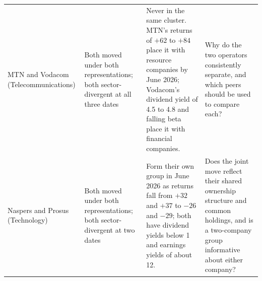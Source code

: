 \begin{table}[htbp]
\begin{tabularx}{\linewidth}{@{}>{\raggedright\arraybackslash}p{2.0cm}>{\raggedright\arraybackslash}p{2.3cm}>{\raggedright\arraybackslash}X>{\raggedright\arraybackslash}X@{}}
\addlinespace
MTN and Vodacom (Telecommunications) & Both moved under both representations; both sector-divergent at all three dates & Never in the same cluster. MTN's returns of $+62$ to $+84$ place it with resource companies by June 2026; Vodacom's dividend yield of 4.5 to 4.8 and falling beta place it with financial companies. & Why do the two operators consistently separate, and which peers should be used to compare each? \\
\addlinespace
Naspers and Prosus (Technology) & Both moved under both representations; both sector-divergent at two dates & Form their own group in June 2026 as returns fall from $+32$ and $+37$ to $-26$ and $-29$; both have dividend yields below 1 and earnings yields of about 12. & Does the joint move reflect their shared ownership structure and common holdings, and is a two-company group informative about either company? \\
\bottomrule
\end{tabularx}
\end{table}
